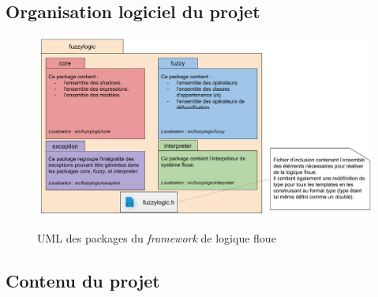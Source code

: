 \documentclass[a4paper,11pt]{article}
\begin{document}
    \subsection{Organisation logiciel du projet}

    \begin{figure}[H]
        \begin{center}
            \caption{UML des packages du \textit{framework} de logique floue}
            \includegraphics[scale=0.51]{assets/Packages_(UML).jpg}
            \label{fig:umlPackage}
        \end{center}
    \end{figure}

    \subsection{Contenu du projet}    
    
\end{document}
